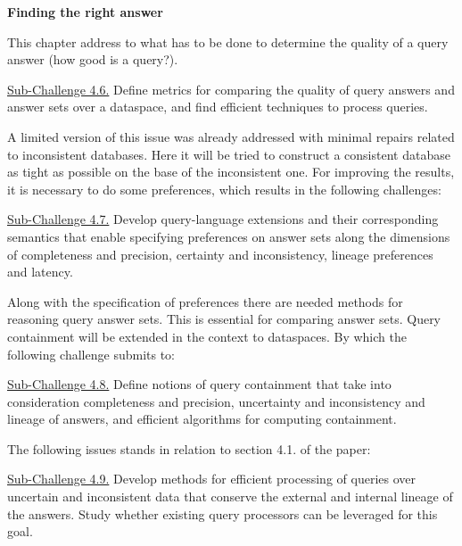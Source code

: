 \textbf{Finding the right answer}

This chapter address to what has to be done to determine the quality of a query answer (how good is a query?).

\uline{Sub-Challenge 4.6.} Define metrics for comparing the quality of query answers and answer sets over a dataspace, and find efficient techniques to process queries.

A limited version of this issue was already addressed with minimal repairs related to inconsistent databases. Here it will be tried to construct a consistent database as tight as possible on the base of the inconsistent one. For improving the results, it is necessary to do some preferences, which results in the following challenges:

\uline{Sub-Challenge 4.7.} Develop query-language extensions and their corresponding semantics that enable specifying preferences on answer sets along the dimensions of completeness and precision, certainty and inconsistency, lineage preferences and latency.

Along with the specification of preferences there are needed methods for reasoning query answer sets. This is essential for comparing answer sets. Query containment \cite{Chandra:1977:OIC:800105.803397} will be extended in the context to dataspaces. By which the following challenge submits to:

\uline{Sub-Challenge 4.8.} Define notions of query containment that take into consideration completeness and precision, uncertainty and inconsistency and lineage of answers, and efficient algorithms for computing containment.

The following issues stands in relation to section 4.1. of the paper:

\uline{Sub-Challenge 4.9.} Develop methods for efficient processing of queries over uncertain and inconsistent data that conserve the external and internal lineage of the answers. Study whether existing query processors can be leveraged for this goal.
